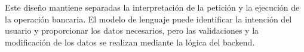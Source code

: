 Este diseño mantiene separadas la interpretación de la petición y la ejecución
de la operación bancaria. El modelo de lenguaje puede identificar la intención
del usuario y proporcionar los datos necesarios, pero las validaciones y la
modificación de los datos se realizan mediante la lógica del backend.